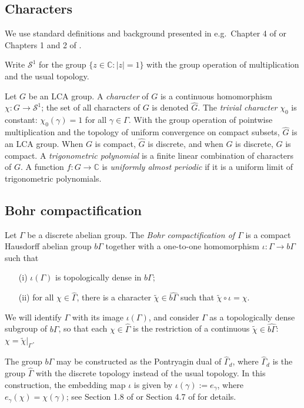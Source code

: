 \documentclass[12pt]{amsart} \usepackage{amsmath,centernot,amssymb,leftindex}
\numberwithin{theorem}{section}
\numberwithin{equation}{section}
\theoremstyle{definition}
\begin{document}
\subsection{Characters} 
	
	We use standard definitions and background presented in e.g.~Chapter 4 of \cite{Folland_CourseInAHA} or Chapters 1 and 2 of \cite{Rudin_Fourier}.  
	
	Write $\mathcal S^1$ for the group $\{z\in \mathbb C: |z|=1\}$ with the group operation of multiplication and the usual topology. 
	
	Let $G$ be an LCA group. A \emph{character} of $G$ is a continuous homomorphism $\chi:G\to \mathcal S^{1}$; the set of all characters of $G$ is denoted $\widehat{G}$.  The \emph{trivial character} $\chi_{0}$ is constant: $\chi_{0}(\gamma)=1$ for all $\gamma\in \Gamma$. With the group operation of pointwise multiplication and the topology of uniform convergence on compact subsets, $\widehat{G}$ is an LCA group.  When $G$ is compact, $\widehat{G}$ is discrete, and when $G$ is discrete, $\widehat{G}$ is compact.  A \emph{trigonometric polynomial} is a finite linear combination of characters of $G$.  A function $f:G\to \mathbb C$ is \emph{uniformly almost periodic} if it is a uniform limit of trigonometric polynomials.  
	
	
	\subsection{Bohr compactification}\label{sec:BohrCompactification}
Let $\Gamma$ be a discrete abelian group. The \emph{Bohr compactification of $\Gamma$} is a compact Hausdorff abelian group  $b\Gamma$ together with a one-to-one homomorphism $\iota:\Gamma \to b\Gamma$ such that
\begin{enumerate}
	\item[(i)] $\iota(\Gamma)$ is topologically dense in $b\Gamma$;
	
	\item[(ii)] for all $\chi\in \widehat{\Gamma}$, there is a character $\tilde{\chi}\in \widehat{b\Gamma}$ such that $\tilde{\chi}\circ \iota = \chi$.
\end{enumerate}
We will identify $\Gamma$ with its image $\iota(\Gamma)$, and consider $\Gamma$ as a topologically dense subgroup of $b\Gamma$, so that each $\chi\in \widehat{\Gamma}$ is the restriction of a continuous $\tilde{\chi}\in \widehat{b\Gamma}$: $\chi = \tilde{\chi}|_\Gamma$.  

The group $b\Gamma$ may be constructed as the Pontryagin dual of $\widehat{\Gamma}_d$, where $\widehat{\Gamma}_d$ is the group $\widehat{\Gamma}$ with the discrete topology instead of the usual topology.  In this construction, the embedding map $\iota$ is given by $\iota(\gamma):=e_\gamma$, where $e_\gamma(\chi)=\chi(\gamma)$; see Section 1.8 of \cite{Rudin_Fourier} or Section 4.7 of \cite{Folland_CourseInAHA} for details.
\end{document}
